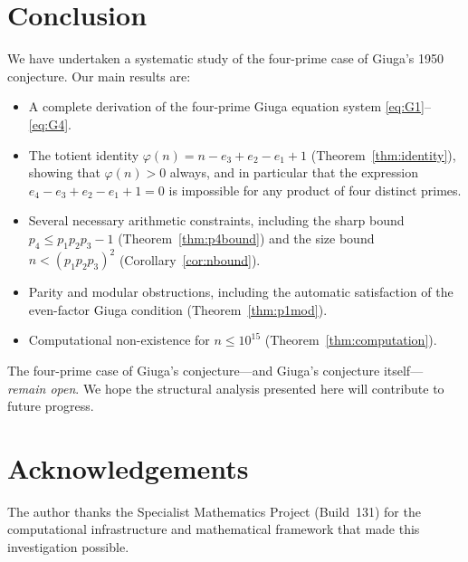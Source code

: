 \documentclass[12pt,a4paper]{amsart}
\theoremstyle{definition}
\begin{document}
\section{Conclusion}
\label{sec:conclusion}

We have undertaken a systematic study of the four-prime case of Giuga's 1950
conjecture.  Our main results are:

\begin{itemize}
  \item A complete derivation of the four-prime Giuga equation system
        \eqref{eq:G1}--\eqref{eq:G4}.
  \item The totient identity $\varphi(n) = n - e_3 + e_2 - e_1 + 1$
        (Theorem~\ref{thm:identity}), showing that $\varphi(n) > 0$ always,
        and in particular that the expression $e_4 - e_3 + e_2 - e_1 + 1 = 0$
        is impossible for any product of four distinct primes.
  \item Several necessary arithmetic constraints, including the sharp bound
        $p_4 \le p_1 p_2 p_3 - 1$ (Theorem~\ref{thm:p4bound}) and the
        size bound $n < (p_1 p_2 p_3)^2$ (Corollary~\ref{cor:nbound}).
  \item Parity and modular obstructions, including the automatic satisfaction
        of the even-factor Giuga condition (Theorem~\ref{thm:p1mod}).
  \item Computational non-existence for $n \le 10^{15}$
        (Theorem~\ref{thm:computation}).
\end{itemize}

The four-prime case of Giuga's conjecture---and Giuga's conjecture itself---
\emph{remain open}.  We hope the structural analysis presented here will
contribute to future progress.

\section*{Acknowledgements}

The author thanks the Specialist Mathematics Project (Build~131) for the
computational infrastructure and mathematical framework that made this
investigation possible.
\end{document}
